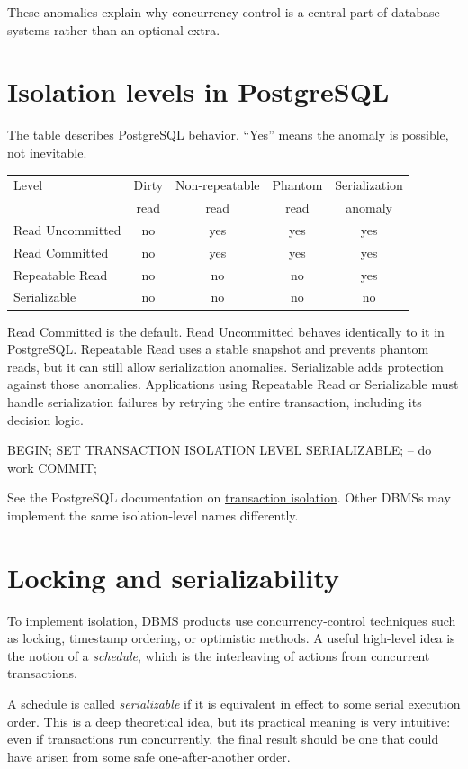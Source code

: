 \documentclass[11pt,a4paper,openany]{book}
\begin{document}
These anomalies explain why concurrency control is a central part of database systems rather than an optional extra.

\section{Isolation levels in PostgreSQL}
The table describes PostgreSQL behavior. ``Yes'' means the anomaly is possible, not inevitable.
\begin{center}
\small
\begin{tabular}{@{}lcccc@{}}
\toprule
Level & Dirty & Non-repeatable & Phantom & Serialization\\
 & read & read & read & anomaly\\
\midrule
Read Uncommitted & no & yes & yes & yes\\
Read Committed & no & yes & yes & yes\\
Repeatable Read & no & no & no & yes\\
Serializable & no & no & no & no\\
\bottomrule
\end{tabular}
\end{center}
Read Committed is the default. Read Uncommitted behaves identically to it in PostgreSQL. Repeatable Read uses a stable snapshot and prevents phantom reads, but it can still allow serialization anomalies. Serializable adds protection against those anomalies. Applications using Repeatable Read or Serializable must handle serialization failures by retrying the entire transaction, including its decision logic.

\begin{codesql}
BEGIN;
SET TRANSACTION ISOLATION LEVEL SERIALIZABLE;
-- do work
COMMIT;
\end{codesql}
See the PostgreSQL documentation on \href{https://www.postgresql.org/docs/18/transaction-iso.html}{transaction isolation}. Other DBMSs may implement the same isolation-level names differently.

\section{Locking and serializability}
To implement isolation, DBMS products use concurrency-control techniques such as locking, timestamp ordering, or optimistic methods. A useful high-level idea is the notion of a \emph{schedule}, which is the interleaving of actions from concurrent transactions.

A schedule is called \emph{serializable} if it is equivalent in effect to some serial execution order. This is a deep theoretical idea, but its practical meaning is very intuitive: even if transactions run concurrently, the final result should be one that could have arisen from some safe one-after-another order.
\end{document}
